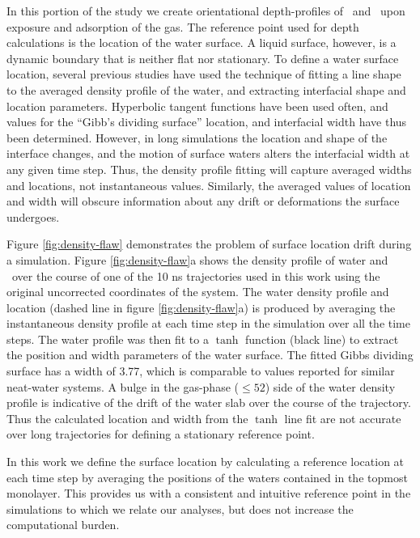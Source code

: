 	In this portion of the study we create orientational depth-profiles of \suldiox~and \wat~upon exposure and adsorption of the gas. The reference point used for depth calculations is the location of the water surface. A liquid surface, however, is a dynamic boundary that is neither flat nor stationary. To define a water surface location, several previous studies have used the technique of fitting a line shape to the averaged density profile of the water, and extracting interfacial shape and location parameters.\cite{Shamay2010,Wick2006c,Chowdhary2006} Hyperbolic tangent functions have been used often, and values for the ``Gibb's dividing surface'' location, and interfacial width have thus been determined.\cite{Matsumoto1988} However, in long simulations the location and shape of the interface changes, and the motion of surface waters alters the interfacial width at any given time step. Thus, the density profile fitting will capture averaged widths and locations, not instantaneous values. Similarly, the averaged values of location and width will obscure information about any drift or deformations the surface undergoes. 
	
Figure \ref{fig:density-flaw} demonstrates the problem of surface location drift during a simulation. Figure \ref{fig:density-flaw}a shows the density profile of water and \suldiox~over the course of one of the 10 ns trajectories used in this work using the original uncorrected coordinates of the system. The water density profile and location (dashed line in figure \ref{fig:density-flaw}a) is produced by averaging the instantaneous density profile at each time step in the simulation over all the time steps. The water profile was then fit to a $\tanh$ function (black line) to extract the position and width parameters of the water surface. The fitted Gibbs dividing surface has a width of 3.77\angs, which is comparable to values reported for similar neat-water systems.\cite{Dang1997,Hore2008} A bulge in the gas-phase ($\leq 52$\angs) side of the water density profile is indicative of the drift of the water slab over the course of the trajectory. Thus the calculated location and width from the $\tanh$ line fit are not accurate over long trajectories for defining a stationary reference point. 

	In this work we define the surface location by calculating a reference location at each time step by averaging the positions of the waters contained in the topmost monolayer. This provides us with a consistent and intuitive reference point in the simulations to which we relate our analyses, but does not increase the computational burden.


